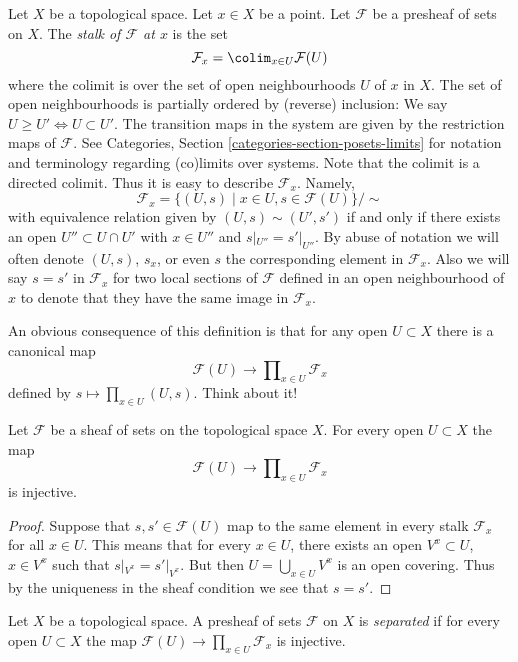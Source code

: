 \noindent
Let $X$ be a topological space. Let $x \in X$ be a point.
Let $\mathcal{F}$ be a presheaf of sets on $X$.
The {\it stalk of $\mathcal{F}$ at $x$} is the set
$$
\mathcal{F}_x
=
\colim_{x\in U} \mathcal{F}(U)
$$
where the colimit is over the set of open neighbourhoods
$U$ of $x$ in $X$. The set of open neighbourhoods is
partially ordered by (reverse) inclusion:
We say $U \geq U' \Leftrightarrow U \subset U'$.
The transition maps in the system are
given by the restriction maps of $\mathcal{F}$.
See Categories, Section \ref{categories-section-posets-limits}
for notation and terminology regarding (co)limits over systems.
Note that the colimit is a directed colimit.
Thus it is easy to describe $\mathcal{F}_x$. Namely,
$$
\mathcal{F}_x
=
\{
(U, s)
\mid
x\in U, s\in \mathcal{F}(U)
\}/\sim
$$
with equivalence relation given by $(U, s) \sim (U', s')$ if and only if
there exists an open $U'' \subset U \cap U'$ with $x \in U''$ and
$s|_{U''} = s'|_{U''}$. By abuse of notation we will often denote
$(U, s)$, $s_x$, or even $s$ the corresponding element in $\mathcal{F}_x$.
Also we will say $s = s'$ in $\mathcal{F}_x$ for two local sections
of $\mathcal{F}$ defined in an open neighbourhood of $x$ to denote that
they have the same image in $\mathcal{F}_x$.

\medskip\noindent
An obvious consequence of this definition is that
for any open $U \subset X$ there is a canonical map
$$
\mathcal{F}(U)
\longrightarrow
\prod\nolimits_{x \in U} \mathcal{F}_x
$$
defined by $s \mapsto \prod_{x \in U} (U, s)$. Think about it!

\begin{lemma}
\label{lemma-sheaf-subset-stalks}
Let $\mathcal{F}$ be a sheaf of sets on the topological space $X$.
For every open $U \subset X$ the map
$$
\mathcal{F}(U)
\longrightarrow
\prod\nolimits_{x \in U} \mathcal{F}_x
$$
is injective.
\end{lemma}

\begin{proof}
Suppose that $s, s' \in \mathcal{F}(U)$ map to the same element
in every stalk $\mathcal{F}_x$ for all $x \in U$. This means that
for every $x \in U$, there exists an open $V^x \subset U$,
$x \in V^x$ such that $s|_{V^x} = s'|_{V^x}$. But then
$U = \bigcup_{x \in U} V^x$ is an open covering. Thus by the
uniqueness in the sheaf condition we see that $s = s'$.
\end{proof}

\begin{definition}
\label{definition-separated}
Let $X$ be a topological space.
A presheaf of sets $\mathcal{F}$ on $X$ is {\it separated}
if for every open $U \subset X$ the map
$\mathcal{F}(U) \to \prod_{x \in U} \mathcal{F}_x$ is
injective.
\end{definition}

